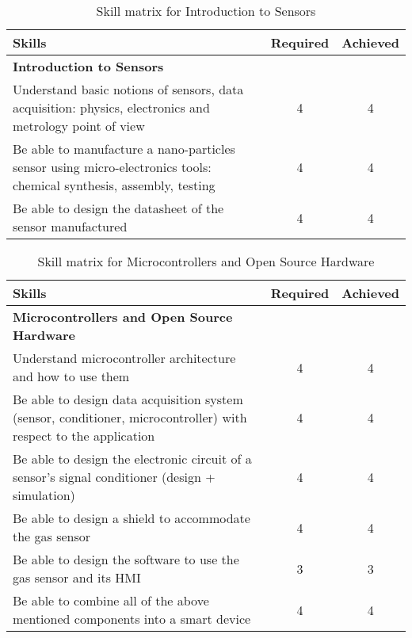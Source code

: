 \begin{table}[h!]
    \centering
    \renewcommand{\arraystretch}{1.5} %
    \begin{tabular}{|p{11cm}|c|c|}
    \hline
    \rowcolor[gray]{0.8}
    \textbf{Skills} & \textbf{Required} & \textbf{Achieved} \\ \hline
    \rowcolor[gray]{0.9} \textbf{Introduction to Sensors} &  &  \\ \hline
    Understand basic notions of sensors, data acquisition: physics, electronics and metrology point of view & 4 & 4 \\ \hline
    Be able to manufacture a nano-particles sensor using micro-electronics tools: chemical synthesis, assembly, testing & 4 & 4 \\ \hline
    Be able to design the datasheet of the sensor manufactured & 4 & 4 \\ \hline
    \end{tabular}
    \caption{Skill matrix for Introduction to Sensors}
    \label{table:skills-intro-sensors}
\end{table}

\begin{table}[h!]
    \centering
    \renewcommand{\arraystretch}{1.5} %
    \begin{tabular}{|p{11cm}|c|c|}
    \hline
    \rowcolor[gray]{0.8}
    \textbf{Skills} & \textbf{Required} & \textbf{Achieved} \\ \hline
    \rowcolor[gray]{0.9} \textbf{Microcontrollers and Open Source Hardware} &  &  \\ \hline
    Understand microcontroller architecture and how to use them & 4 & 4 \\ \hline
    Be able to design data acquisition system (sensor, conditioner, microcontroller) with respect to the application & 4 & 4 \\ \hline
    Be able to design the electronic circuit of a sensor’s signal conditioner (design + simulation) & 4 & 4 \\ \hline
    Be able to design a shield to accommodate the gas sensor & 4 & 4 \\ \hline
    Be able to design the software to use the gas sensor and its HMI & 3 & 3 \\ \hline
    Be able to combine all of the above mentioned components into a smart device & 4 & 4 \\ \hline
    \end{tabular}
    \caption{Skill matrix for Microcontrollers and Open Source Hardware}
    \label{table:skills-microcontrollers}
\end{table}

